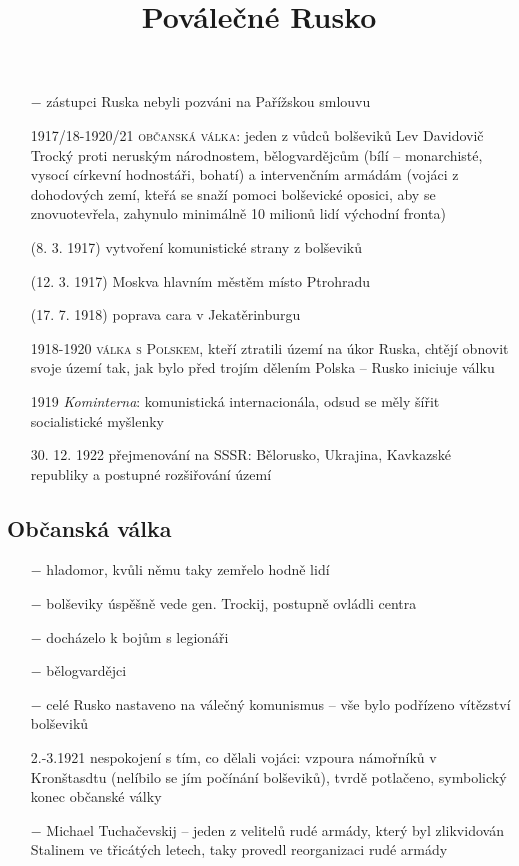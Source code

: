\documentclass{article}
\title{\vspace{-2cm}Poválečné Rusko\vspace{-1.7cm}}
\date{}
\author{}
\begin{document}
\maketitle

\begin{itemize}
    \vspace{-0.5em}
    \setlength\itemsep{0.15em}
    \item[$-$] zástupci Ruska nebyli pozváni na Pařížskou smlouvu
    \item[1917/18-1920/21] \textsc{občanská válka}: jeden z vůdců bolševiků Lev Davidovič Trocký proti neruským národnostem, bělogvardějcům (bílí -- monarchisté, vysocí církevní hodnostáři, bohatí) a intervenčním armádám (vojáci z dohodových zemí, kteřá se snaží pomoci bolševické oposici, aby se znovuotevřela, zahynulo minimálně 10 milionů lidí východní fronta)
    \item[(8. 3. 1917)] vytvoření komunistické strany z bolševiků
    \item[(12. 3. 1917)] Moskva hlavním městěm místo Ptrohradu
    \item[(17. 7. 1918)] poprava cara v Jekatěrinburgu
    \item[1918-1920] \textsc{válka s Polskem}, kteří ztratili území na úkor Ruska, chtějí obnovit svoje území tak, jak bylo před trojím dělením Polska -- Rusko iniciuje válku
    \item[1919] \textit{Kominterna}: komunistická internacionála, odsud se měly šířit socialistické myšlenky
    \item[30. 12. 1922] přejmenování na SSSR: Bělorusko, Ukrajina, Kavkazské republiky a postupné rozšiřování území
\end{itemize}

\subsection*{Občanská válka}
\begin{itemize}
    \vspace{-0.5em}
    \setlength\itemsep{0.15em}
    \item[$-$] hladomor, kvůli němu taky zemřelo hodně lidí
    \item[$-$] bolševiky úspěšně vede gen. Trockij, postupně ovládli centra
    \item[$-$] docházelo k bojům s legionáři
    \item[$-$] bělogvardějci
    \item[$-$] celé Rusko nastaveno na válečný komunismus -- vše bylo podřízeno vítězství bolševiků
    \item[2.-3.1921] nespokojení s tím, co dělali vojáci: vzpoura námořníků v Kronštasdtu (nelíbilo se jím počínání bolševiků), tvrdě potlačeno, symbolický konec občanské války
    \item[$-$] Michael Tuchačevskij -- jeden z velitelů rudé armády, který byl zlikvidován Stalinem ve třicátých letech, taky provedl reorganizaci rudé armády
\end{itemize}
\end{document}
